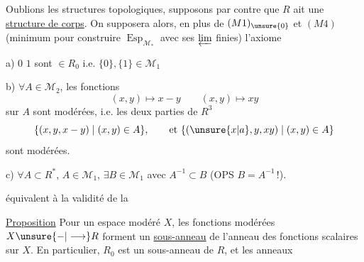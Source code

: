 Oublions les structures topologiques, supposons par contre que $R$ ait une \uline{structure de corps}. On supposera alors,  en plus de $(M1)_{\unsure{0}}$ et $(M4)$ (minimum pour construire $\operatorname{Esp}_{\mathcal M_*}$ avec ses $\varprojlim$ finies) l'axiome


a) $0$  $1$ sont $\in R_0$ i.e. $\{0\},\{1\}\in\mathcal M_1$

b) $\forall A\in\mathcal M_2$, les fonctions
\[
 (x,y)\longmapsto x-y\qquad
 (x,y)\longmapsto xy
\]
sur $A$ sont modérées,  i.e. les deux parties de $R^3$
\[
 \{(x,y,x-y)\mid(x,y)\in A\},\qquad\text{et }\{(\unsure{x|a},y,xy)\mid(x,y)\in A\}
\]
sont modérées.

c) $\forall A\subset R^*$, $A\in\mathcal M_1$, $\exists B\in\mathcal M_1$ avec $A^{-1}\subset B$ (OPS $B=A^{-1}$\,!).

   équivalent à la validité de la


\uline{Proposition} Pour un espace modéré $X$, les fonctions modérées $X\unsure{-|\longrightarrow}R$  forment un \uline{sous-anneau} de l'anneau des fonctions scalaires sur $X$. En particulier, $R_0$ est un sous-anneau de $R$, et les anneaux
